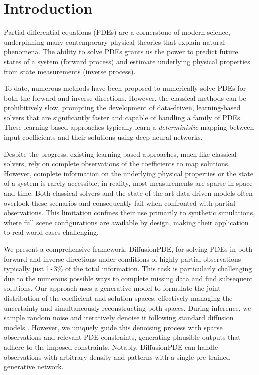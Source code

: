 
\section{Introduction}\label{sec:intro}
Partial differential equations (PDEs) are a cornerstone of modern science, underpinning many contemporary physical theories that explain natural phenomena. The ability to solve PDEs grants us the power to predict future states of a system (forward process) and estimate underlying physical properties from state measurements (inverse process).

To date, numerous methods \cite{aliabadi2020boundary,solin2005partial} have been proposed to numerically solve PDEs for both the forward and inverse directions. However, the classical methods can be prohibitively slow, prompting the development of data-driven, learning-based solvers that are significantly faster and capable of handling a family of PDEs. These learning-based approaches \cite{li2020fourier, li2021physics, lu2021learning, raissi2019physics} typically learn a {\em deterministic} mapping between input coefficients and their solutions using deep neural networks. 


Despite the progress, existing learning-based approaches, much like classical solvers, rely on complete observations of the coefficients to map solutions. However, complete information on the underlying physical properties or the state of a system is rarely accessible; in reality, most measurements are sparse in space and time. Both classical solvers and the state-of-the-art data-driven models often overlook these scenarios and consequently fail when confronted with partial observations. This limitation confines their use primarily to synthetic simulations, where full scene configurations are available by design, making their application to real-world cases challenging.

We present a comprehensive framework, DiffusionPDE, for solving PDEs in both forward and inverse directions under conditions of highly partial observations—typically just 1\textasciitilde 3\% of the total information. This task is particularly challenging due to the numerous possible ways to complete missing data and find subsequent solutions. Our approach uses a generative model to formulate the joint distribution of the coefficient and solution spaces, effectively managing the uncertainty and simultaneously reconstructing both spaces. During inference, we sample random noise and iteratively denoise it following standard diffusion models \cite{ho2020denoising}. However, we uniquely guide this denoising process with sparse observations and relevant PDE constraints, generating plausible outputs that adhere to the imposed constraints. Notably, DiffusionPDE can handle observations with arbitrary density and patterns with a single pre-trained generative network.


